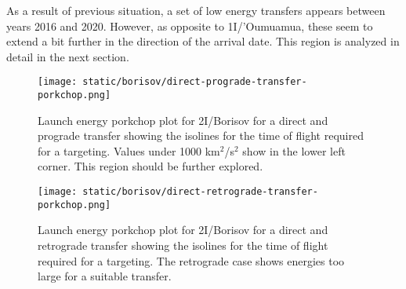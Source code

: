 As a result of previous situation, a set of low energy transfers appears between
years 2016 and 2020. However, as opposite to 1I/'Oumuamua, these seem to extend a
bit further in the direction of the arrival date. This region is analyzed in
detail in the next section.

\begin{figure}[H]
  \centering
  \texttt{[image: static/borisov/direct-prograde-transfer-porkchop.png]}
  \caption[Direct and prograde launch energy porkchop for
    2I/Borisov]{Launch energy porkchop plot for 2I/Borisov for a direct and prograde
    transfer showing the isolines for
    the time of flight required for a targeting. Values under 1000
    km$^2$/s$^2$ show in the lower left corner. This region should be
    further explored.}
  \label{fig:borisov-direct-prograde-transfer-porkchop}
\end{figure}

\begin{figure}[H]
  \centering
  \texttt{[image: static/borisov/direct-retrograde-transfer-porkchop.png]}
  \caption[Direct and retrograde launch energy porkchop for
    2I/Borisov]{Launch energy porkchop plot for 2I/Borisov for a direct and
    retrograde transfer showing the isolines for
    the time of flight required for a targeting. The retrograde case shows
    energies too large for a suitable transfer.}
  \label{fig:borisov-direct-retrograde-transfer-porkchop}
\end{figure}

